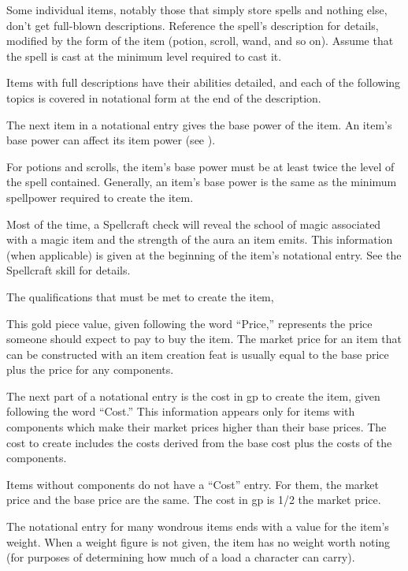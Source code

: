     Some individual items, notably those that simply store spells and nothing else, don't get full-blown descriptions.
    Reference the spell's description for details, modified by the form of the item (potion, scroll, wand, and so on).
    Assume that the spell is cast at the minimum level required to cast it.

    Items with full descriptions have their abilities detailed, and each of the following topics is covered in notational form at the end of the description.

     The next item in a notational entry gives the base power of the item.
    An item's base power can affect its item power (see ).

    For potions and scrolls, the item's base power must be at least twice the level of the spell contained.
    Generally, an item's base power is the same as the minimum spellpower required to create the item.

     Most of the time, a Spellcraft check will reveal the school of magic associated with a magic item and the strength of the aura an item emits.
    This information (when applicable) is given at the beginning of the item's notational entry.
    See the Spellcraft skill for details.

     The qualifications that must be met to create the item, %

     This gold piece value, given following the word ``Price,'' represents the price someone should expect to pay to buy the item.
    The market price for an item that can be constructed with an item creation feat is usually equal to the base price plus the price for any components.

     The next part of a notational entry is the cost in gp to create the item, given following the word ``Cost.'' This information appears only for items with components which make their market prices higher than their base prices.
    The cost to create includes the costs derived from the base cost plus the costs of the components.

    Items without components do not have a ``Cost'' entry.
    For them, the market price and the base price are the same.
    The cost in gp is 1/2 the market price.

     The notational entry for many wondrous items ends with a value for the item's weight.
    When a weight figure is not given, the item has no weight worth noting (for purposes of determining how much of a load a character can carry).

